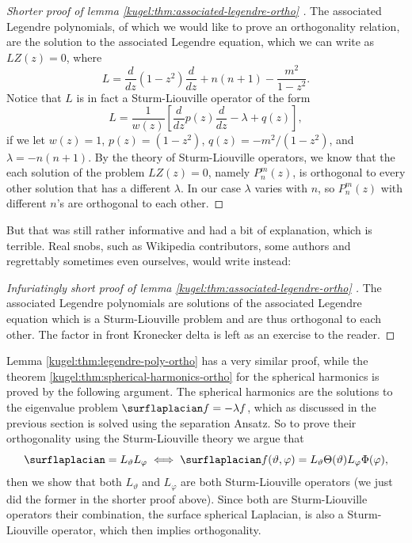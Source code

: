 \begin{proof}[
    Shorter proof of lemma \ref{kugel:thm:associated-legendre-ortho}
  ]
  The associated Legendre polynomials, of which we would like to prove an
  orthogonality relation, are the solution to the associated Legendre equation,
  which we can write as $LZ(z) = 0$, where
  \begin{equation*}
    L = \frac{d}{dz} (1 - z^2) \frac{d}{dz}
      + n(n+1) - \frac{m^2}{1 - z^2}.
  \end{equation*}
  Notice that $L$ is in fact a Sturm-Liouville operator of the form
  \begin{equation*}
    L = \frac{1}{w(z)} \left[
        \frac{d}{dz} p(z) \frac{d}{dz} - \lambda + q(z)
      \right],
  \end{equation*}
  if we let $w(z) = 1$, $p(z) = (1 - z^2 )$, $q(z) = -m^2 / (1 - z^2)$, and
  $\lambda = -n(n+1)$. By the theory of Sturm-Liouville operators, we know that
  the each solution of the problem $LZ(z) = 0$, namely $P^m_n(z)$, is orthogonal
  to every other solution that has a different $\lambda$. In our case $\lambda$
  varies with $n$, so $P^m_n(z)$ with different $n$'s are orthogonal to each
  other.
\end{proof}

But that was still rather informative and had a bit of explanation, which is
terrible. Real snobs, such as Wikipedia contributors, some authors and
regrettably sometimes even ourselves, would write instead:

\begin{proof}[
    Infuriatingly short proof of lemma \ref{kugel:thm:associated-legendre-ortho}
  ]
  The associated Legendre polynomials are solutions of the associated Legendre
  equation which is a Sturm-Liouville problem and are thus orthogonal to each
  other. The factor in front Kronecker delta is left as an exercise to the
  reader.
\end{proof}

Lemma \ref{kugel:thm:legendre-poly-ortho} has a very similar proof, while the
theorem \ref{kugel:thm:spherical-harmonics-ortho} for the spherical harmonics is
proved by the following argument.  The spherical harmonics are the solutions to
the eigenvalue problem $\surflaplacian f = -\lambda f$, which as discussed in
the previous section is solved using the separation Ansatz. So to prove their
orthogonality using the Sturm-Liouville theory we argue that
\begin{equation*}
  \surflaplacian = L_\vartheta L_\varphi \iff
  \surflaplacian f(\vartheta, \varphi)
    = L_\vartheta \Theta(\vartheta) L_\varphi \Phi(\varphi),
\end{equation*}
then we show that both $L_\vartheta$ and $L_\varphi$ are both Sturm-Liouville
operators (we just did the former in the shorter proof above). Since both are
Sturm-Liouville operators their combination, the surface spherical Laplacian, is
also a Sturm-Liouville operator, which then implies orthogonality.

